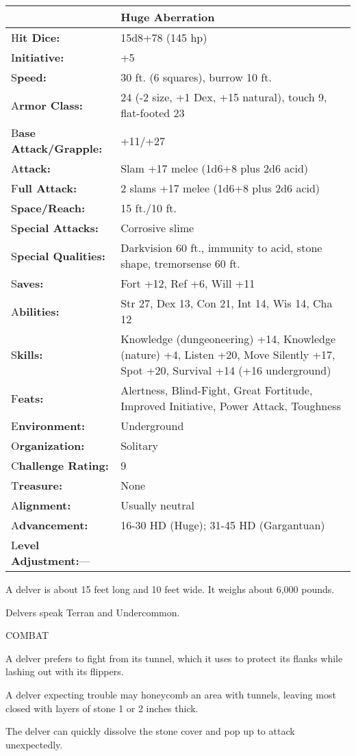 \documentclass{article}
\begin{document}
\begin{tabular}{|>{\raggedright}p{91pt}|>{\raggedright}p{231pt}|}
\hline
  & Huge Aberration\tabularnewline
\hline
H\textbf{it Dice:} & 15d8+78 (145 hp)\tabularnewline
\hline
I\textbf{nitiative:} & +5\tabularnewline
\hline
S\textbf{peed:} & 30 ft. (6 squares), burrow 10 ft.\tabularnewline
\hline
A\textbf{rmor Class:} & 24 (-2 size, +1 Dex, +15 natural), touch 9, flat-footed 
23\tabularnewline
\hline
B\textbf{ase Attack/Grapple:} & +11/+27\tabularnewline
\hline
A\textbf{ttack:} & Slam +17 melee (1d6+8 plus 2d6 acid)\tabularnewline
\hline
F\textbf{ull Attack:} & 2 slams +17 melee (1d6+8 plus 2d6 acid)\tabularnewline
\hline
S\textbf{pace/Reach:} & 15 ft./10 ft.\tabularnewline
\hline
S\textbf{pecial Attacks:} & Corrosive slime\tabularnewline
\hline
S\textbf{pecial Qualities:} & Darkvision 60 ft., immunity to acid, stone shape, 
tremorsense 60 ft.\tabularnewline
\hline
S\textbf{aves:} & Fort +12, Ref +6, Will +11\tabularnewline
\hline
A\textbf{bilities:} & Str 27, Dex 13, Con 21, Int 14, Wis 14, Cha 12\tabularnewline
\hline
S\textbf{kills:} & Knowledge (dungeoneering) +14, Knowledge (nature) +4, Listen 
+20, Move Silently +17, Spot +20, Survival +14 (+16 underground)\tabularnewline
\hline
F\textbf{eats:} & Alertness, Blind-Fight, Great Fortitude, Improved Initiative, 
Power Attack, Toughness\tabularnewline
\hline
E\textbf{nvironment:} & Underground\tabularnewline
\hline
O\textbf{rganization:} & Solitary\tabularnewline
\hline
C\textbf{hallenge Rating:} & 9\tabularnewline
\hline
T\textbf{reasure:} & None\tabularnewline
\hline
A\textbf{lignment:} & Usually neutral\tabularnewline
\hline
A\textbf{dvancement:} & 16-30 HD (Huge); 31-45 HD (Gargantuan)\tabularnewline
\hline
L\textbf{evel Adjustment:}--- & \tabularnewline
\hline
\end{tabular}

A delver is about 15 feet long and 10 feet wide. It weighs about 6,000 pounds.

Delvers speak Terran and Undercommon.

COMBAT

A delver prefers to fight from its tunnel, which it uses to protect its flanks 
while lashing out with its flippers.

A delver expecting trouble may honeycomb an area with tunnels, leaving most closed 
with layers of stone 1 or 2 inches thick.

The delver can quickly dissolve the stone cover and pop up to attack unexpectedly.
\end{document}
